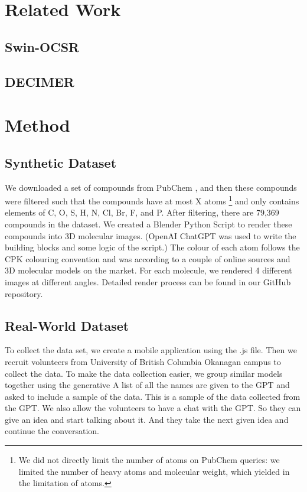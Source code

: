 \documentclass{article}
\begin{document}
\section{Related Work}
\subsection{Swin-OCSR}
\subsection{DECIMER}

\section{Method}
\subsection{Synthetic Dataset}
We downloaded a set of compounds from PubChem \cite{kim_pubchem_2023}, and then these compounds were filtered such that the compounds have at most X atoms \footnote{We did not directly limit the number of atoms on PubChem queries: we limited the number of heavy atoms and molecular weight, which yielded in the limitation of atoms.} and only contains elements of C, O, S, H, N, Cl, Br, F, and P.
After filtering, there are 79,369 compounds in the dataset. We created a Blender Python Script to render these compounds into 3D molecular images. (OpenAI ChatGPT was used to write the building blocks and some logic of the script.) The colour of each atom follows the CPK colouring convention and was according to a couple of online sources and 3D molecular models on the market. For each molecule, we rendered 4 different images at different angles. Detailed render process can be found in our GitHub repository. 
\subsection{Real-World Dataset}
To collect the data set, we create a mobile application using the .js file. Then we recruit volunteers from University of British Columbia Okanagan campus to collect the data. To make the data collection easier, we group similar models together using the generative A list of all the names are given to the GPT and asked to include a sample of the data. This is a sample of the data collected from the GPT. We also allow the volunteers to have a chat with the GPT. So they can give an idea and start talking about it. And they take the next given idea and continue the conversation.
\end{document}
